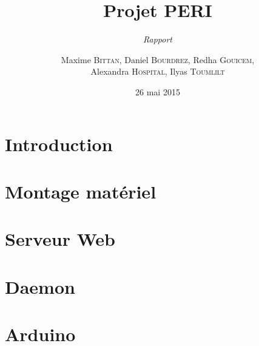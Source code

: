 \documentclass{scrreprt}
\begin{document}
\title{Projet PERI}
\subtitle{\textit{Rapport}}
\date{26 mai 2015}
\author{Maxime \textsc{Bittan}, Daniel \textsc{Bourdrez}, Redha \textsc{Gouicem},\\ Alexandra \textsc{Hospital}, Ilyas \textsc{Toumlilt}}


\maketitle

\pagebreak
\tableofcontents


\chapter*{Introduction}


\chapter{Montage matériel}
\label{ch:montage}


\chapter{Serveur Web}


\chapter{Daemon}


\chapter{Arduino}

\end{document}
